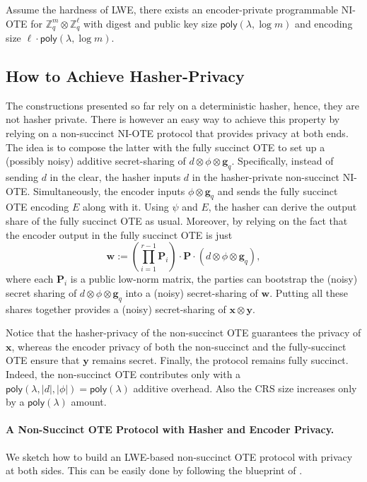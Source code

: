 \documentclass{theoretics}
\newcommand{\poly}{\mathsf{poly}}
\renewcommand{\sec}{\ensuremath{\lambda}}
\begin{document}
{
\begin{theorem}
Assume the hardness of LWE, there exists an
encoder-private programmable NI-OTE for
$\mathbb Z_q^m \otimes \mathbb Z_q^\ell$ with digest and public key size $\poly(\lambda,\log m)$ and encoding size $\ell \cdot \poly(\lambda,\log m)$.
\end{theorem}
}
{
\subsection{How to Achieve Hasher-Privacy}
The constructions presented so far rely on a deterministic hasher, hence, they are not hasher private. There is however an easy way to achieve this property by relying on a non-succinct NI-OTE protocol that provides privacy at both ends. The idea is to compose the latter with the fully succinct OTE to set up a (possibly noisy) additive secret-sharing of $d\otimes \phi\otimes \mathbf{g}_q$. Specifically, instead of sending $d$ in the clear, the hasher inputs $d$ in the hasher-private non-succinct NI-OTE. Simultaneously, the encoder inputs $\phi\otimes \mathbf{g}_q$ and sends the fully succinct OTE encoding $E$ along with it. Using $\psi$ and $E$, the hasher can derive the output share of the fully succinct OTE as usual. Moreover, by relying on the fact that the encoder output in the fully succinct OTE is just
\[\mathbf{w}:=\left(\prod_{i=1}^{r-1}\mathbf{P}_i\right)\cdot \mathbf{P} \cdot (d\otimes \phi\otimes \mathbf{g}_q),\]
where each $\mathbf{P}_i$ is  a public low-norm matrix, the parties can bootstrap the (noisy) secret sharing of $d\otimes \phi\otimes \mathbf{g}_q$ into a (noisy) secret-sharing of $\mathbf{w}$. Putting all these shares together provides a (noisy) secret-sharing of $\mathbf{x}\otimes \mathbf{y}$.}

{
Notice that the hasher-privacy of the non-succinct OTE guarantees the privacy of $\mathbf{x}$, whereas the encoder privacy of both the non-succinct and the fully-succinct OTE ensure that $\mathbf{y}$ remains secret. Finally, the protocol remains fully succinct. Indeed, the non-succinct OTE contributes only with a $\poly(\sec, \lvert d\rvert, \lvert \phi\rvert)=\poly(\sec)$ additive overhead. Also the CRS size increases only by a $\poly(\sec)$ amount.}

{
\paragraph{A Non-Succinct OTE Protocol with Hasher and Encoder Privacy.} We sketch how to build an LWE-based non-succinct OTE protocol with privacy at both sides. This can be easily done by following the blueprint of \cite{EC:OrlSchYak21,C:ADOS22,EC:AbrRoySch24}.}
\end{document}
